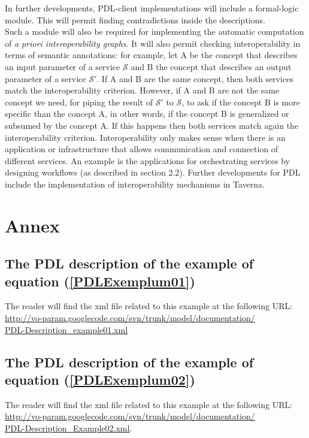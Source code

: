 \documentclass[a4paper,11pt] {ivoa}
\begin{document}
\noindent In further developments, PDL-client implementations will include a formal-logic module. This will permit finding contradictions inside the descriptions.\\
Such a  module will also be required for implementing the automatic computation of {\it a priori interoperability graphs}. 
It will also permit checking interoperability in terms of semantic annotations: for example, let A be the concept that describes an input parameter of a service $\mathcal S$ and B the concept that describes an output parameter of a service $\mathcal S'$. If A and B are the same concept, then both services match the interoperability criterion. However, if A and B are not the same concept we need, for piping the result of  
$\mathcal S'$ to $\mathcal S$, to ask if the concept B is more specific than the concept A, in other words, if the concept B is generalized or subsumed by the concept A. If this happens then both services match again the interoperability criterion. 
Interoperability only makes sense when there is an application or infrastructure that allows communication and connection of different services. An example is the applications for orchestrating services by designing workflows (as described in section 2.2). Further developments for PDL include the implementation of interoperability mechanisms in Taverna.


\section{Annex}

\subsection{The PDL description of the example of equation (\ref{PDLExemplum01})}\label{Exemplum1XML}
The reader will find the xml file related to this example at the following URL:\\
\href{http://vo-param.googlecode.com/svn/trunk/model/documentation/PDL-Description_example01.xml}{http://vo-param.googlecode.com/svn/trunk/model/documentation/\\PDL-Description\_example01.xml}


\subsection{The PDL description of the example of equation (\ref{PDLExemplum02})}\label{Exemplum2XML}
The reader will find the xml file related to this example at the following URL:\\ 
\href{http://vo-param.googlecode.com/svn/trunk/model/documentation/PDL-Description_Example02.xml}{http://vo-param.googlecode.com/svn/trunk/model/documentation/\\PDL-Description\_Example02.xml}.
\end{document}
